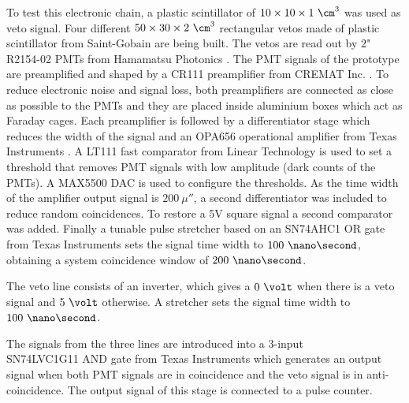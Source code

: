 \begin{enumerate}
To test this electronic chain, a plastic scintillator of $10 \times 10 \times 1~\cm^3$ was used as veto signal. Four different $50\times 30 \times 2~\cm^3$  rectangular vetos made of plastic scintillator from Saint-Gobain \cite{VetoAveiro} are being built. The vetos are read out by $2$" R2154-02 PMTs from Hamamatsu Photonics \cite{DataSheetPMTsAveiro}. The PMT signals of the prototype are preamplified and shaped by a CR111 preamplifier from CREMAT Inc. \cite{CREMATPreAmplifierDataSheet}. To reduce electronic noise and signal loss, both preamplifiers are connected as close as possible to the PMTs and they are placed inside aluminium boxes which act as Faraday cages. Each preamplifier is followed by a differentiator stage which reduces the width of the signal and an OPA656 operational amplifier from Texas Instruments \cite{OPA656}. A LT111 fast comparator from Linear Technology \cite{LT111} is used to set a threshold that removes PMT signals with low amplitude (dark counts of the PMTs). A MAX5500 DAC is used to configure the thresholds. As the time width of the amplifier output signal is $200~\mu\second$, a second differentiator was included to reduce random coincidences. To restore a 5V square signal a second comparator was added. Finally a tunable pulse stretcher based on an SN74AHC1 OR gate from Texas Instruments \cite{Stretcher} sets the signal time width to $100~\nano\second$, obtaining a system coincidence window of $200~\nano\second$.

The veto line consists of an inverter, which gives a $0~\volt$ when there is a veto signal and $5~\volt$ otherwise. A stretcher sets the signal time width to $100~\nano\second$.

The signals from the three lines are introduced into a 3-input \\ SN74LVC1G11 AND gate from Texas Instruments \cite{ANDGate} which generates an output signal when both PMT signals are in coincidence and the veto signal is in anti-coincidence. The output signal of this stage is connected to a pulse counter. 


\end{enumerate}
